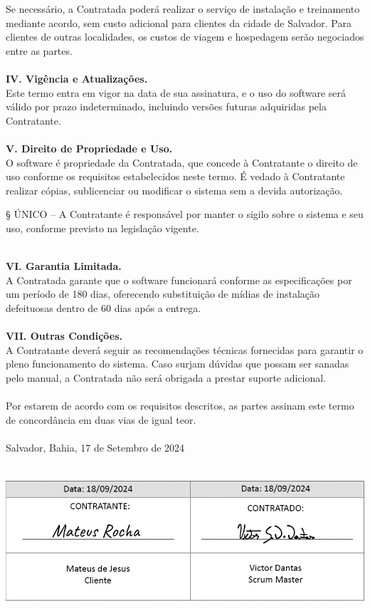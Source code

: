 Se necessário, a Contratada poderá realizar o serviço de instalação e treinamento mediante acordo, sem custo adicional para clientes da cidade de Salvador. Para clientes de outras localidades, os custos de viagem e hospedagem serão negociados entre as partes.\\\\


\textbf{IV. Vigência e Atualizações.}\\
Este termo entra em vigor na data de sua assinatura, e o uso do software será válido por prazo indeterminado, incluindo versões futuras adquiridas pela Contratante.\\\\


\textbf{V. Direito de Propriedade e Uso.}\\
O software é propriedade da Contratada, que concede à Contratante o direito de uso conforme os requisitos estabelecidos neste termo. É vedado à Contratante realizar cópias, sublicenciar ou modificar o sistema sem a devida autorização.\\

\begingroup

    \leftskip 20pt
    \rightskip 20pt
    
    § ÚNICO – A Contratante é responsável por manter o sigilo sobre o sistema e seu uso, conforme previsto na legislação vigente.\\\\

\endgroup

\textbf{VI. Garantia Limitada.}\\
A Contratada garante que o software funcionará conforme as especificações por um período de 180 dias, oferecendo substituição de mídias de instalação defeituosas dentro de 60 dias após a entrega.\\\\


\textbf{VII. Outras Condições.}\\
A Contratante deverá seguir as recomendações técnicas fornecidas para garantir o pleno funcionamento do sistema. Caso surjam dúvidas que possam ser sanadas pelo manual, a Contratada não será obrigada a prestar suporte adicional.\\\\

Por estarem de acordo com os requisitos descritos, as partes assinam este termo de concordância em duas vias de igual teor.\\\\

Salvador, Bahia, 17 de Setembro de 2024\\\\

\endgroup

\begin{center}
    \includegraphics[width=1\textwidth]{imagens-template/Assinatura.png} 
\end{center}